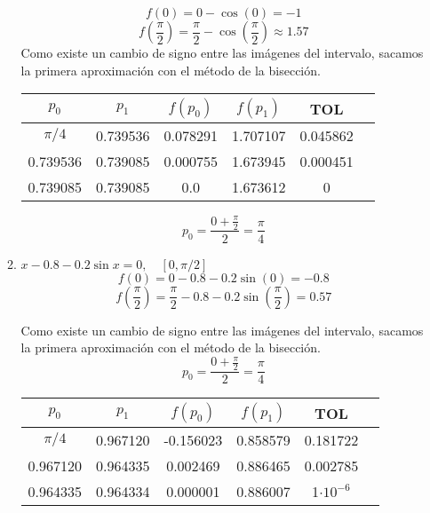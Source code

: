\documentclass[12pt]{article}
\begin{document}
\begin{enumerate}
\begin{enumerate}
        \[f(0) = 0 - \cos{(0)} = -1\]
        \[f(\frac{\pi}{2}) = \frac{\pi}{2} - \cos{(\frac{\pi}{2})} \approx 1.57\]
        Como existe un cambio de signo entre las imágenes del intervalo, sacamos la primera aproximación con el método de la bisección.

        \begin{center}
        \begin{tabular}{|c|c|c|c|c|c|}
        \hline
        \(p_0\) & \(p_1\) & \(f(p_0)\) & \(f(p_1)\) & \textbf{TOL} \\
        \hline
        \(\pi / 4\) & 0.739536 & 0.078291 & 1.707107 &  0.045862 \\
        0.739536 & 0.739085 & 0.000755 & 1.673945 &  0.000451 \\
        0.739085 & 0.739085 & 0.0 & 1.673612 &  0 \\
        \hline 
        \end{tabular}
        \end{center}

        \[p_0 = \frac{0 + \frac{\pi}{2}}{2} = \frac{\pi}{4}\]


        \item \( x - 0.8 - 0.2\sin x = 0, \quad [0, \pi/2] \)
        \[f(0) = 0 - 0.8 - 0.2\sin{(0)} = -0.8\] 
        \[f(\frac{\pi}{2}) = \frac{\pi}{2} - 0.8 - 0.2\sin{(\frac{\pi}{2})} = 0.57\]
        
        Como existe un cambio de signo entre las imágenes del intervalo, sacamos la primera aproximación con el método de la bisección.
        \[p_0 = \frac{0 + \frac{\pi}{2}}{2} = \frac{\pi}{4}\]
        
        \begin{center}
        \begin{tabular}{|c|c|c|c|c|c|}
        \hline
        \(p_0\) & \(p_1\) & \(f(p_0)\) & \(f(p_1)\) & \textbf{TOL} \\
        \hline
        \(\pi / 4\) & 0.967120 & -0.156023 & 0.858579 &  0.181722 \\
        0.967120 & 0.964335 & 0.002469 & 0.886465 &  0.002785 \\
        0.964335 & 0.964334 & 0.000001 & 0.886007 &  1\(\cdot 10^{-6}\) \\
        \hline 
        \end{tabular}
        \end{center}



    \end{enumerate}


\end{enumerate}
\end{document}
